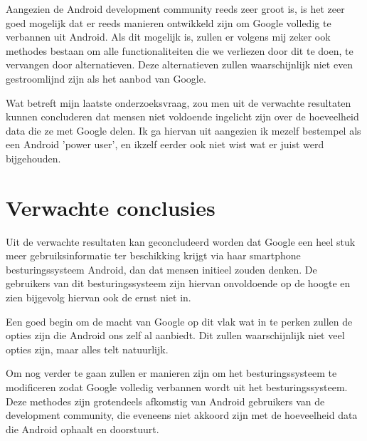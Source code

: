 \vspace{3mm}

\noindent Aangezien de Android development community reeds zeer groot is, is het zeer goed mogelijk dat er reeds manieren ontwikkeld zijn om Google volledig te verbannen uit Android. Als dit mogelijk is, zullen er volgens mij zeker ook methodes bestaan om alle functionaliteiten die we verliezen door dit te doen, te vervangen door alternatieven. Deze alternatieven zullen waarschijnlijk niet even gestroomlijnd zijn als het aanbod van Google. 

\vspace{3mm}

\noindent Wat betreft mijn laatste onderzoeksvraag, zou men uit de verwachte resultaten kunnen concluderen dat mensen niet voldoende ingelicht zijn over de hoeveelheid data die ze met Google delen. Ik ga hiervan uit aangezien ik mezelf bestempel als een Android 'power user', en ikzelf eerder ook niet wist wat er juist werd bijgehouden.


\section{Verwachte conclusies}
\label{sec:verwachte_conclusies}


Uit de verwachte resultaten kan geconcludeerd worden dat Google een heel stuk meer gebruiksinformatie ter beschikking krijgt via haar smartphone besturingssysteem Android, dan dat mensen initieel zouden denken. De gebruikers van dit besturingssysteem zijn hiervan onvoldoende op de hoogte en zien bijgevolg hiervan ook de ernst niet in.

\vspace{3mm}

\noindent Een goed begin om de macht van Google op dit vlak wat in te perken zullen de opties zijn die Android ons zelf al aanbiedt. Dit zullen waarschijnlijk niet veel opties zijn, maar alles telt natuurlijk. 

\vspace{3mm}

\noindent Om nog verder te gaan zullen er manieren zijn om het besturingssysteem te modificeren zodat Google volledig verbannen wordt uit het besturingssysteem. Deze methodes zijn grotendeels afkomstig van Android gebruikers van de development community, die eveneens niet akkoord zijn met de hoeveelheid data die Android ophaalt en doorstuurt.


